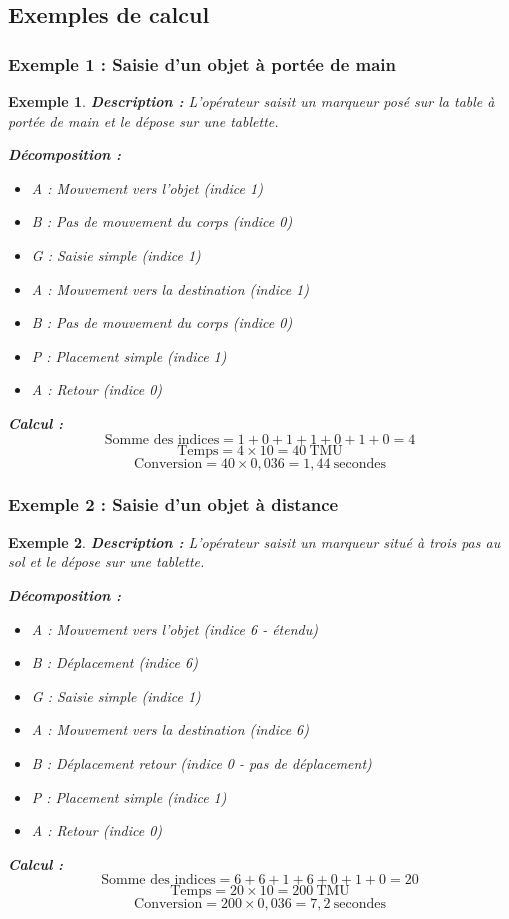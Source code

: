 \documentclass[a4paper,12pt]{article}
\newtheorem{exemple}{Exemple}[section]
\begin{document}
\subsection{Exemples de calcul}

\subsubsection{Exemple 1 : Saisie d'un objet à portée de main}

\begin{exemple}
\textbf{Description :} L'opérateur saisit un marqueur posé sur la table à portée de main et le dépose sur une tablette.

\textbf{Décomposition :}
\begin{itemize}
    \item A : Mouvement vers l'objet (indice 1)
    \item B : Pas de mouvement du corps (indice 0)
    \item G : Saisie simple (indice 1)
    \item A : Mouvement vers la destination (indice 1)
    \item B : Pas de mouvement du corps (indice 0)
    \item P : Placement simple (indice 1)
    \item A : Retour (indice 0)
\end{itemize}

\textbf{Calcul :}
\[
\text{Somme des indices} = 1 + 0 + 1 + 1 + 0 + 1 + 0 = 4
\]
\[
\text{Temps} = 4 \times 10 = 40\ \text{TMU}
\]
\[
\text{Conversion} = 40 \times 0,036 = 1,44\ \text{secondes}
\]
\end{exemple}

\subsubsection{Exemple 2 : Saisie d'un objet à distance}

\begin{exemple}
\textbf{Description :} L'opérateur saisit un marqueur situé à trois pas au sol et le dépose sur une tablette.

\textbf{Décomposition :}
\begin{itemize}
    \item A : Mouvement vers l'objet (indice 6 - étendu)
    \item B : Déplacement (indice 6)
    \item G : Saisie simple (indice 1)
    \item A : Mouvement vers la destination (indice 6)
    \item B : Déplacement retour (indice 0 - pas de déplacement)
    \item P : Placement simple (indice 1)
    \item A : Retour (indice 0)
\end{itemize}

\textbf{Calcul :}
\[
\text{Somme des indices} = 6 + 6 + 1 + 6 + 0 + 1 + 0 = 20
\]
\[
\text{Temps} = 20 \times 10 = 200\ \text{TMU}
\]
\[
\text{Conversion} = 200 \times 0,036 = 7,2\ \text{secondes}
\]
\end{exemple}
\end{document}
